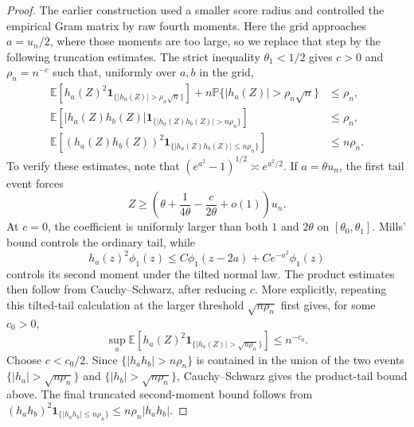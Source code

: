 \documentclass[11pt]{article}
\theoremstyle{definition}
\numberwithin{equation}{section}
\begin{document}
\begin{proof}
The earlier construction used a smaller score radius and controlled the
empirical Gram matrix by raw fourth moments. Here the grid approaches
\(a=u_n/2\), where those moments are too large, so we replace that step by
the following truncation estimates.
The strict inequality \(\theta_1<1/2\) gives \(c>0\) and
\(\rho_n=n^{-c}\) such that, uniformly over \(a,b\) in the grid,
\begin{align*}
    \mathbb E\!\left[h_a(Z)^2
        \mathbf 1_{\{|h_a(Z)|>\rho_n\sqrt n\}}\right]
    +n\mathbb P\{|h_a(Z)|>\rho_n\sqrt n\}
    &\le \rho_n,\\
    \mathbb E\!\left[|h_a(Z)h_b(Z)|
        \mathbf 1_{\{|h_a(Z)h_b(Z)|>n\rho_n\}}\right]
    &\le \rho_n,\\
    \mathbb E\!\left[(h_a(Z)h_b(Z))^2
        \mathbf 1_{\{|h_a(Z)h_b(Z)|\le n\rho_n\}}\right]
    &\le n\rho_n.
\end{align*}
To verify these estimates, note that
\((e^{a^2}-1)^{1/2}\asymp e^{a^2/2}\). If \(a=\theta u_n\), the first
tail event forces
\[
    Z\ge
    \left(\theta+\frac1{4\theta}-\frac{c}{2\theta}+o(1)\right)u_n.
\]
At \(c=0\), the coefficient is uniformly larger than both \(1\) and
\(2\theta\) on \([\theta_0,\theta_1]\). Mills' bound controls the ordinary
tail, while
\[
    h_a(z)^2\phi_1(z)
    \le C\phi_1(z-2a)+Ce^{-a^2}\phi_1(z)
\]
controls its second moment under the tilted normal law. The product estimates
then follow from Cauchy--Schwarz, after reducing \(c\). More explicitly,
repeating this tilted-tail calculation at the larger threshold
\(\sqrt{n\rho_n}\) first gives, for
some \(c_0>0\),
\[
 \sup_a\mathbb E\!\left[h_a(Z)^2
   \mathbf 1_{\{|h_a(Z)|>\sqrt{n\rho_n}\}}\right]
 \le n^{-c_0}.
\]
Choose \(c<c_0/2\). Since
\(\{|h_ah_b|>n\rho_n\}\) is contained in the union of the two events
\(\{|h_a|>\sqrt{n\rho_n}\}\) and
\(\{|h_b|>\sqrt{n\rho_n}\}\), Cauchy--Schwarz gives the product-tail
bound above. The final truncated second-moment bound follows from
\((h_ah_b)^2\mathbf 1_{\{|h_ah_b|\le n\rho_n\}}
\le n\rho_n|h_ah_b|\).


\end{proof}
\end{document}
